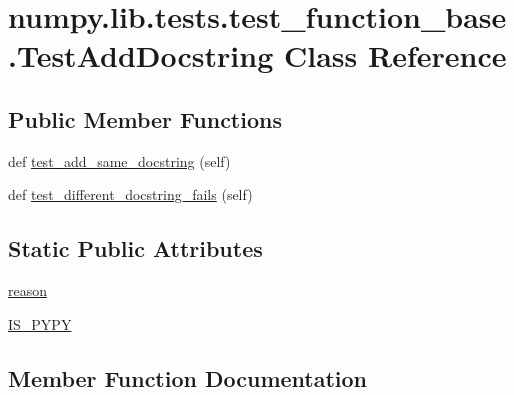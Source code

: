 \hypertarget{classnumpy_1_1lib_1_1tests_1_1test__function__base_1_1TestAddDocstring}{}\section{numpy.\+lib.\+tests.\+test\+\_\+function\+\_\+base.\+Test\+Add\+Docstring Class Reference}
\label{classnumpy_1_1lib_1_1tests_1_1test__function__base_1_1TestAddDocstring}
\subsection*{Public Member Functions}
\begin{DoxyCompactItemize}
\item 
def \hyperlink{classnumpy_1_1lib_1_1tests_1_1test__function__base_1_1TestAddDocstring_aaf43ce3c563cbe2bd0e3eb98dc935a8b}{test\+\_\+add\+\_\+same\+\_\+docstring} (self)
\item 
def \hyperlink{classnumpy_1_1lib_1_1tests_1_1test__function__base_1_1TestAddDocstring_ad15e64a5ac4a4f4864a7dda6be82705d}{test\+\_\+different\+\_\+docstring\+\_\+fails} (self)
\end{DoxyCompactItemize}
\subsection*{Static Public Attributes}
\begin{DoxyCompactItemize}
\item 
\hyperlink{classnumpy_1_1lib_1_1tests_1_1test__function__base_1_1TestAddDocstring_ad2289d3176821e1c165088661357df69}{reason}
\item 
\hyperlink{classnumpy_1_1lib_1_1tests_1_1test__function__base_1_1TestAddDocstring_a9d151ef0c1bdd49e4026d2180451b5f1}{I\+S\+\_\+\+P\+Y\+PY}
\end{DoxyCompactItemize}


\subsection{Member Function Documentation}
\mbox{\label{classnumpy_1_1lib_1_1tests_1_1test__function__base_1_1TestAddDocstring_aaf43ce3c563cbe2bd0e3eb98dc935a8b}} 
